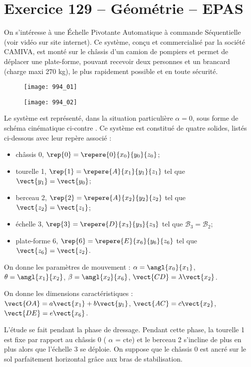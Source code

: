 \section*{Exercice 129 -- Géométrie -- EPAS}
\setcounter{exo}{0}


On s’intéresse à une Échelle Pivotante Automatique à commande Séquentielle (voir vidéo sur site internet).
Ce système, conçu et commercialisé par la société CAMIVA, est monté sur le châssis d’un camion de pompiers et permet de
déplacer une plate-forme, pouvant recevoir deux personnes et un brancard (charge maxi 270 kg), le plus rapidement
possible et en toute sécurité.

\begin{figure}[H]
\centering
\texttt{[image: 994\_01]}
\end{figure}

\begin{figure}[H]
\centering
\texttt{[image: 994\_02]}
\end{figure}



Le système est représenté, dans la situation particulière $\alpha= 0$, sous forme de schéma cinématique ci-contre .
Ce système est constitué de quatre solides, listés ci-dessous avec leur repère associé :
\begin{itemize}
\item châssis 0, $\rep{0}=\repere{0}{x_0}{y_0}{z_0}$;
\item tourelle 1, $\rep{1}=\repere{A}{x_1}{y_1}{z_1}$ tel que $\vect{y_1}=\vect{y_0}$;
\item berceau 2, $\rep{2}=\repere{A}{x_2}{y_2}{z_2}$ tel que $\vect{z_2}=\vect{z_1}$;
\item échelle 3, $\rep{3}=\repere{D}{x_3}{y_3}{z_3}$ tel que $\mathcal{B}_3=\mathcal{B}_2$;
\item plate-forme 6, $\rep{6}=\repere{E}{x_6}{y_6}{z_6}$ tel que $\vect{z_6}=\vect{z_2}$.
\end{itemize}

On donne les paramètres de mouvement :
$\alpha = \angl{x_0}{x_1}$, $\theta= \angl{x_1}{x_2}$, $\beta = \angl{x_2}{x_6}$, $\vect{CD}= \lambda \vect{x_2}$.

On donne les dimensions caractéristiques : $\vect{OA}=a\vect{x_1} + b\vect{y_1}$, $\vect{AC} = c\vect{x_2}$, $\vect{DE}=e\vect{x_6}$.

L’étude se fait pendant la phase de dressage. Pendant cette phase, la tourelle 1 est fixe par rapport au châssis 0 ( $\alpha$ = cte) et le berceau 2 s’incline de plus en plus alors que l’échelle 3 se déploie. On suppose que le châssis 0 est ancré sur le sol
parfaitement horizontal grâce aux bras de stabilisation.

